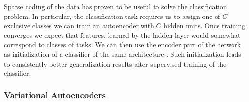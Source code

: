 Sparse coding of the data has proven to be useful to solve the classification problem.
In particular, the classification task requires us to assign one of $C$ exclusive classes we can train an autoencoder with $C$ hidden units. Once training converges we expect that features, learned by the hidden layer would somewhat correspond to classes of tasks. We can then use the encoder part of the network as initialization of a classifier of the same architecture \cite{Masci2011}.
Such initialization leads to consistently better generalization results after supervised training of the classifier.

\subsubsection{Variational Autoencoders}\label{ch:vae}



